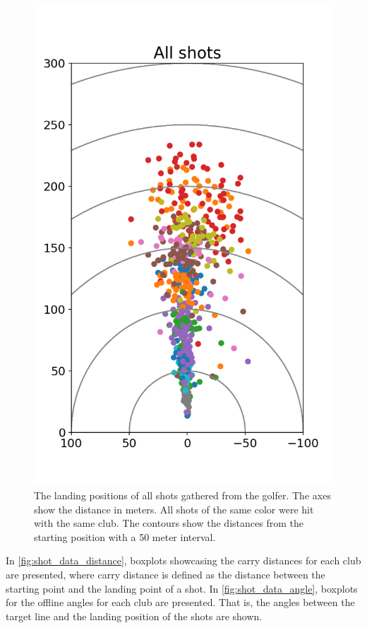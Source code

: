 \documentclass{kththesis}
\begin{document}
\begin{figure}
    \centering
    \includegraphics[height=0.4\textheight]{Shots/all_shots.png}
    \caption{The landing positions of all shots gathered from the golfer. The axes show the distance in meters. All shots of the same color were hit with the same club. The contours show the distances from the starting position with a 50 meter interval.}
    \label{fig:all_shots}
\end{figure}

In \autoref{fig:shot_data_distance}, boxplots showcasing the carry distances for each club are presented, where carry distance is defined as the distance between the starting point and the landing point of a shot. In \autoref{fig:shot_data_angle}, boxplots for the offline angles for each club are presented. That is, the angles between the target line and the landing position of the shots are shown.
\end{document}

